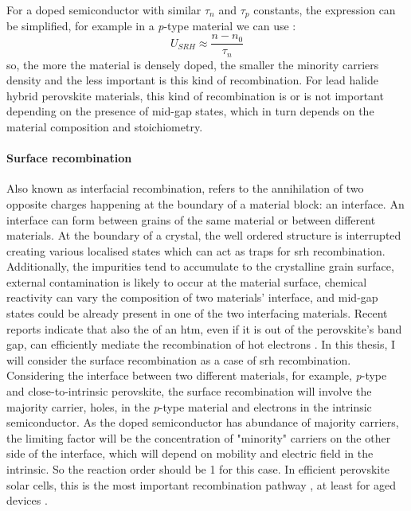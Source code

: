 		For a doped semiconductor with similar $\tau_n$ and $\tau_p$ constants, the expression can be simplified, for example in a \textit{p}-type material we can use \cite[108]{Nelson2003}:
		\begin{equation}
			U_{SRH} \approx \frac{n-n_0}{\tau_n}
		\end{equation}
		so, the more the material is densely doped, the smaller the minority carriers density and the less important is this kind of recombination.
		For lead halide hybrid perovskite materials, this kind of recombination is or is not important depending on the presence of mid-gap states, which in turn depends on the material composition and stoichiometry.

		\paragraph{Surface recombination}\label{intro_surface_recombination}
		Also known as interfacial recombination, refers to the annihilation of two opposite charges happening at the boundary of a material block: an interface.
		An interface can form between grains of the same material or between different materials.
		At the boundary of a crystal, the well ordered structure is interrupted creating various localised states which can act as traps for \gls{srh} recombination.
		Additionally, the impurities tend to accumulate to the crystalline grain surface, external contamination is likely to occur at the material surface, chemical reactivity can vary the composition of two materials' interface, and mid-gap states could be already present in one of the two interfacing materials.
		Recent reports indicate that also the  of an \gls{htm}, even if it is out of the perovskite's band gap, can efficiently mediate the recombination of hot electrons \cite{Jimenez-Lopez2018,Droseros2019}.
		In this thesis, I will consider the surface recombination as a case of \gls{srh} recombination.
		Considering the interface between two different materials, for example, \textit{p}-type  and close-to-intrinsic perovskite, the surface recombination will involve the majority carrier, holes, in the \textit{p}-type material and electrons in the intrinsic semiconductor.
		As the doped semiconductor has abundance of majority carriers, the limiting factor will be the concentration of "minority" carriers on the other side of the interface, which will depend on mobility and electric field in the intrinsic.
		So the reaction order should be 1 for this case.
		In efficient perovskite solar cells, this is the most important recombination pathway \cite{Calado2019,Carnie2015,Stolterfoht2018a}, at least for aged devices \cite{Tress2018,Correa-Baena2017a}.

